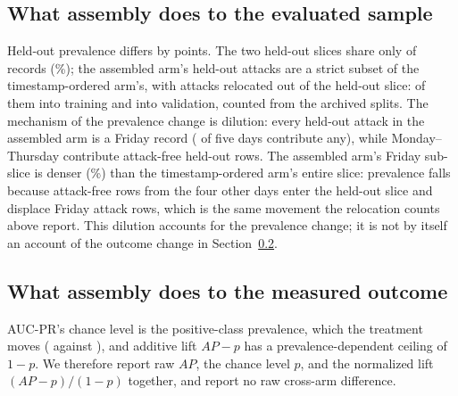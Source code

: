 \documentclass[manuscript,screen,nonacm]{acmart}
\begin{document}
\subsection{What assembly does to the evaluated sample}
Held-out prevalence differs by \SFourCicidsPrevShiftAbsPp{} points. The two
held-out slices share only \CicidsHeldoutOverlap{} of \CicidsHeldoutSize{}
records (\CicidsHeldoutOverlapPct\%); the assembled arm's held-out attacks are
a strict subset of the timestamp-ordered arm's, with
\CicidsAttacksMovedOutOfHeldout{} attacks relocated out of the held-out slice:
\RefRelocatedToTraining{} of them into training and \RefRelocatedToValidation{}
into validation, counted from the archived splits. The
mechanism of the prevalence change is dilution: every held-out attack in the
assembled arm is a Friday record
(\CicidsSyntheticHeldoutAttackDays{} of five days contribute any), while
Monday--Thursday contribute \CicidsHeldoutAttackFreeRows{} attack-free held-out
rows. The assembled arm's Friday sub-slice is denser
(\CicidsFridayHeldoutDensityPct\%) than the timestamp-ordered arm's entire
slice: prevalence falls because attack-free rows from the four other days enter
the held-out slice and displace Friday attack rows, which is the same movement
the relocation counts above report. This dilution accounts for the prevalence change; it
is not by itself an account of the outcome change in
Section~\ref{sec:outcome}.

\begin{table}
\caption{The assembly contrast. Held-out prevalence, attacks, and the evaluated
detector's AUC-PR per arm. Every cell is a macro resolving to an archived
manifest.}
\label{tab:contrast}

\end{table}

\subsection{What assembly does to the measured outcome}
\label{sec:outcome}
AUC-PR's chance level is the positive-class prevalence, which the treatment
moves (\SFourCicidsNaturalChanceFloor{} against
\SFourCicidsSyntheticChanceFloor), and additive lift $AP-p$ has a
prevalence-dependent ceiling of $1-p$. We therefore report raw $AP$, the chance
level $p$, and the normalized lift $(AP-p)/(1-p)$ together, and report no raw
cross-arm difference.
\end{document}
